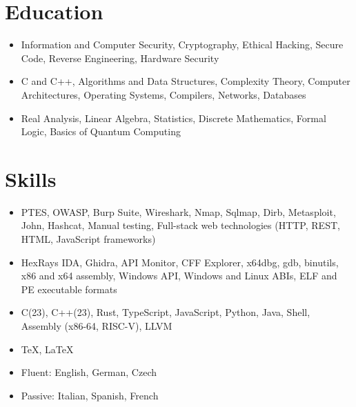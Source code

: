 \documentclass{customcv}
\begin{document}
\section{Education}
    \begin{itemize}
      \item Information and Computer Security, Cryptography, Ethical Hacking, Secure Code, Reverse Engineering,
      Hardware Security
      
      \item C and C++, Algorithms and Data Structures, Complexity Theory, Computer Architectures,
      Operating Systems, Compilers, Networks, Databases
      
      \item Real Analysis, Linear Algebra, Statistics, Discrete Mathematics, Formal Logic,
      Basics of Quantum Computing
    \end{itemize}

    
\section{Skills}
    \begin{itemize}
      \item PTES, OWASP, Burp Suite, Wireshark, Nmap, Sqlmap, Dirb, Metasploit, John, Hashcat,
      Manual testing, Full-stack web technologies (HTTP, REST, HTML, JavaScript frameworks)
    \end{itemize}

    \begin{itemize}
      \item HexRays IDA, Ghidra, API Monitor, CFF Explorer, x64dbg, gdb, binutils,
      x86 and x64 assembly, Windows API, Windows and Linux ABIs, ELF and PE executable formats
    \end{itemize}

    \begin{itemize}
      \item C(23), C++(23), Rust, TypeScript, JavaScript, Python, Java, Shell,
      Assembly (x86-64, RISC-V), LLVM
      
      \item \TeX, \LaTeX
    \end{itemize}

    \begin{itemize}
      \item Fluent: English, German, Czech
      
      \item Passive: Italian, Spanish, French
    \end{itemize}
\end{document}
